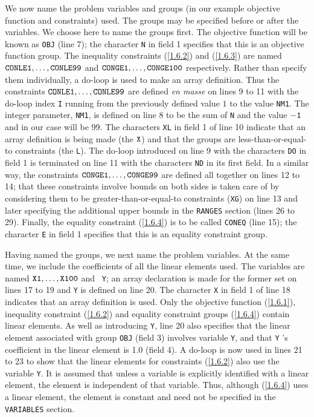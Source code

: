 \documentclass[a4paper]{article}
\newcommand{\req}[1]{(\ref{#1})}
\begin{document}
We now name the problem variables
and groups
(in our example objective function and constraints)
used. The groups may  be specified before or
after  the variables. We  choose here to name  the   groups first.
The  objective  function
will  be known as   {\tt OBJ} (line  7); the
character {\tt  N} in  field 1 specifies  that  this is  an  objective
function    group.
The  inequality constraints    \req{1.6.2}
and \req{1.6.3} are  named ${\tt  CONLE1},\ldots,  {\tt CONLE99}$  and
${\tt  CONGE1},\ldots,  {\tt  CONGE100}$  respectively.  Rather   than
specify them individually, a do-loop
is used to make an array
definition.  Thus the constraints
${\tt CONLE1,\ldots, CONLE99}$  are defined {\em en masse}
on lines 9  to  11 with  the do-loop  index  {\tt I}  running from the
previously defined  value $1$ to the  value  {\tt  NM1}.   The integer
parameter, {\tt  NM1},
is defined on line 8 to be the sum of {\tt  N} and the value
${\tt -1}$ and in our case will  be 99.   The characters  {\tt XL}
in field 1 of line 10 indicate that an  array
definition is being made
(the  ${\tt  X}$)    and  that the   groups
are less-than-or-equal-to
constraints
(the {\tt L}).  The do-loop introduced on  line 9 with the
characters {\tt DO}
in  field 1 is  terminated on  line 11  with  the
characters {\tt  ND}
in   its    first field.  In  a   similar  way,  the constraints ${\tt
CONGE1,\ldots, CONGE99}$ are defined all  together on lines 12 to  14;
that these constraints involve  bounds
on  both sides is taken care of
by considering  them to  be greater-than-or-equal-to constraints
({\tt XG})
on  line  13 and later  specifying the additional upper bounds in
the {\tt RANGES}
section  (lines 26 to  29).  Finally,
the equality constraint \req{1.6.4}
is to be  called {\tt CONEQ} (line 15); the character   {\tt E}
in   field  1 specifies that this  is  an equality constraint group.

Having named the groups,
we  next name the  problem variables.
At the
same time,  we include the  coefficients  of  all  the linear elements
used.  The variables are named  ${\tt X1},\ldots, {\tt X100}$ and {\tt
Y}; an array
declaration is made for the former set on  lines 17 to 19
and {\tt Y} is defined on line 20. The character {\tt X} in field 1 of
line 18 indicates that an array definition is used. Only the objective
function
\req{1.6.1}, inequality  constraint
\req{1.6.2} and equality
constraint  groups
\req{1.6.4}  contain  linear  elements.
As well as
introducing  {\tt Y}, line  20 also specifies  that the linear element
associated with group {\tt  OBJ} (field  3) involves variable  {\tt Y},
and that {\tt Y} 's coefficient in the linear element
is  {1.0} (field 4).  A do-loop
is now used in lines 21 to 23  to  show that the linear
elements  for constraints \req{1.6.2} also use  the  variable {\tt Y}.
It is assumed  that unless a variable is  explicitly identified with a
linear element,  the element is  independent of that variable.   Thus,
although  \req{1.6.4} uses  a linear element,  the element is constant
and need not be specified in the {\tt VARIABLES}
section.
\end{document}
